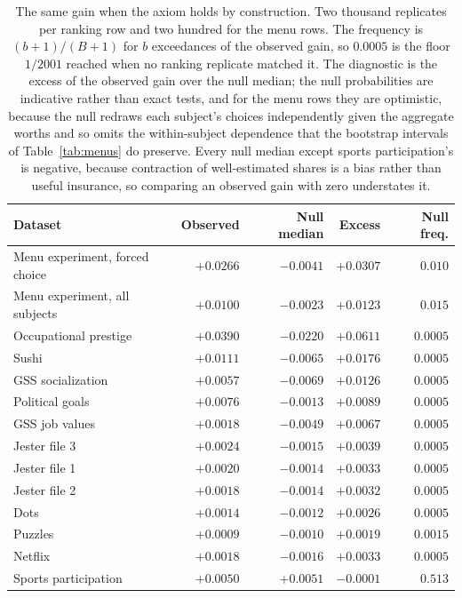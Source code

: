 \documentclass[11pt]{article}
\theoremstyle{italichead}
\begin{document}
\begin{table}[htbp]
\centering
\small
\begin{tabular}{lrrrr}
\toprule
Dataset & Observed & Null median & Excess & Null freq. \\
\midrule
Menu experiment, forced choice & $+0.0266$ & $-0.0041$ & $+0.0307$ & $0.010$ \\
Menu experiment, all subjects & $+0.0100$ & $-0.0023$ & $+0.0123$ & $0.015$ \\
\midrule
Occupational prestige & $+0.0390$ & $-0.0220$ & $+0.0611$ & $0.0005$ \\
Sushi & $+0.0111$ & $-0.0065$ & $+0.0176$ & $0.0005$ \\
GSS socialization & $+0.0057$ & $-0.0069$ & $+0.0126$ & $0.0005$ \\
Political goals & $+0.0076$ & $-0.0013$ & $+0.0089$ & $0.0005$ \\
GSS job values & $+0.0018$ & $-0.0049$ & $+0.0067$ & $0.0005$ \\
Jester file 3 & $+0.0024$ & $-0.0015$ & $+0.0039$ & $0.0005$ \\
Jester file 1 & $+0.0020$ & $-0.0014$ & $+0.0033$ & $0.0005$ \\
Jester file 2 & $+0.0018$ & $-0.0014$ & $+0.0032$ & $0.0005$ \\
Dots & $+0.0014$ & $-0.0012$ & $+0.0026$ & $0.0005$ \\
Puzzles & $+0.0009$ & $-0.0010$ & $+0.0019$ & $0.0015$ \\
Netflix & $+0.0018$ & $-0.0016$ & $+0.0033$ & $0.0005$ \\
\midrule
Sports participation & $+0.0050$ & $+0.0051$ & $-0.0001$ & $0.513$ \\
\bottomrule
\end{tabular}
\caption{The same gain when the axiom holds by construction. Two thousand replicates per ranking
row and two hundred for the menu rows. The frequency is $(b+1)/(B+1)$ for $b$ exceedances of the
observed gain, so $0.0005$ is the floor $1/2001$ reached when no ranking replicate matched it. The diagnostic is the excess of the observed gain over the null median; the null
probabilities are indicative rather than exact tests, and for the menu rows they are
optimistic, because the null redraws each subject's choices independently given
the aggregate worths and so omits the within-subject dependence that the bootstrap
intervals of Table~\ref{tab:menus} do preserve. Every null median except sports participation's is
negative, because contraction of well-estimated shares is a bias rather than useful insurance,
so comparing an observed gain with zero understates it.}
\label{tab:null}
\end{table}
\end{document}
